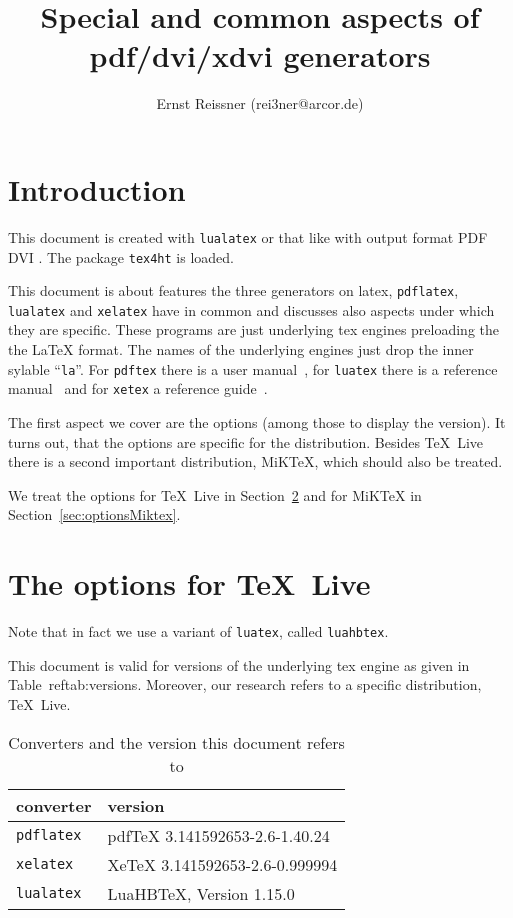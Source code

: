 \documentclass{article}
\title{Special and common aspects of pdf/dvi/xdvi generators }
\author{Ernst Reissner (rei3ner@arcor.de)}
\date{}
\newcommand{\pdflatex}{\texttt{pdflatex}}
\newcommand{\lualatex}{\texttt{lualatex}}
\newcommand{\xelatex}{\texttt{xelatex}}
\newcommand{\texlive}{\TeX~Live}
\newcommand{\miktex}{MiKTeX}
\begin{document}
\maketitle
\tableofcontents
\listoftables

\section{Introduction}

This document is created with \lualatex{} or that like 
with output format 
\ifpdf%
PDF%
\else
DVI%
\fi.
The package \texttt{tex4ht} 
is  loaded. 

This document is about features the three generators on latex, 
\pdflatex, \lualatex{} and \xelatex{} have in common 
and discusses also aspects under which they are specific. 
These programs are just underlying tex engines preloading the the \LaTeX{} format. 
The names of the underlying engines just drop the inner sylable "`\texttt{la}"'. 
For \texttt{pdftex} there is a user manual~\cite{PdfTexUsr}, 
for \texttt{luatex} there is a reference manual~\cite{LuaTexRef} and 
for \texttt{xetex} a reference guide~\cite{XeTexRef}. 

The first aspect we cover are the options (among those to display the version). 
It turns out, that the options are specific for the distribution. 
Besides \texlive{} there is a second important distribution, \miktex, 
which should also be treated. 





We treat the options for \texlive{} in Section~\ref{sec:optionsTexlive} 
and for \miktex{} in Section~\ref{sec:optionsMiktex}. 

\section{The options for \texlive}\label{sec:optionsTexlive}


Note that in fact we use a variant of \texttt{luatex}, called \texttt{luahbtex}. 

This document is valid for versions of the underlying tex engine 
as given in Table~ref{tab:versions}. 
Moreover, our research refers to a specific distribution, \texlive. 


\begin{longtable}{|ll|}
  \toprule
  converter & version \\
  \midrule
  \midrule
  \endfirsthead%
  \bottomrule
  \caption{\label{tab:versions} Converters and the version this document refers to }
  \endlastfoot%
  \pdflatex{}  & pdfTeX 3.141592653-2.6-1.40.24 \\
  \xelatex{}   & XeTeX 3.141592653-2.6-0.999994 \\
  \lualatex{}  & LuaHBTeX, Version 1.15.0 \\
\end{longtable}
\end{document}
